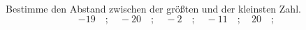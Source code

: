 \begin{aufgabe} ~ \\ 
Bestimme den Abstand zwischen der größten und der kleinsten Zahl.\[-19\quad ; \quad-20\quad ; \quad-2\quad ; \quad-11\quad ; \quad20\quad ; \quad\]\underline{\hspace{12cm}}\end{aufgabe} 
